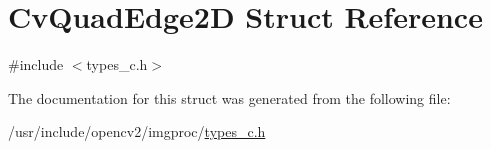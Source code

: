 \hypertarget{structCvQuadEdge2D}{\section{Cv\-Quad\-Edge2\-D Struct Reference}
\label{structCvQuadEdge2D}
}


{\ttfamily \#include $<$types\-\_\-c.\-h$>$}



The documentation for this struct was generated from the following file\-:\begin{DoxyCompactItemize}
\item 
/usr/include/opencv2/imgproc/\hyperlink{imgproc_2types__c_8h}{types\-\_\-c.\-h}\end{DoxyCompactItemize}
